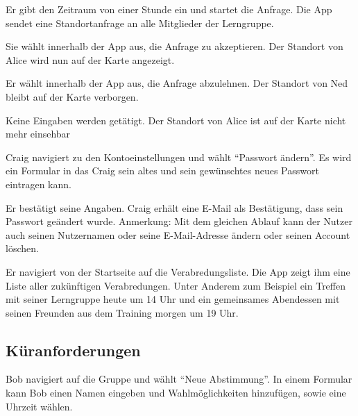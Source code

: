 \documentclass[parskip=full,11pt]{scrartcl}
\begin{document}
{Er gibt den Zeitraum von einer Stunde ein und startet die Anfrage.}
{Die App sendet eine Standortanfrage an alle Mitglieder der Lerngruppe.}

{Sie wählt innerhalb der App aus, die Anfrage zu akzeptieren.}
{Der Standort von Alice wird nun auf der Karte angezeigt.}

{Er wählt innerhalb der App aus, die Anfrage abzulehnen.}
{Der Standort von Ned bleibt auf der Karte verborgen.}

{Keine Eingaben werden getätigt.}
{Der Standort von Alice ist auf der Karte nicht mehr einsehbar}


{Craig navigiert zu den Kontoeinstellungen und wählt \enquote{Passwort ändern}.}
{Es wird ein Formular in das Craig sein altes und sein gewünschtes neues Passwort eintragen kann.}

{Er bestätigt seine Angaben.}
{Craig erhält eine E-Mail als Bestätigung, dass sein Passwort geändert wurde.}
Anmerkung: Mit dem gleichen Ablauf kann der Nutzer auch seinen Nutzernamen oder seine
E-Mail-Adresse ändern oder seinen Account löschen.



{Er navigiert von der Startseite auf die Verabredungsliste.}
{Die App zeigt ihm eine Liste aller zukünftigen Verabredungen.
Unter Anderem zum Beispiel ein Treffen mit seiner Lerngruppe heute um 14 Uhr
und ein gemeinsames Abendessen mit seinen Freunden aus dem Training morgen um 19 Uhr.}


\subsection{Küranforderungen}
{Bob navigiert auf die Gruppe und wählt \enquote{Neue Abstimmung}.}
{In einem Formular kann Bob einen Namen eingeben und Wahlmöglichkeiten hinzufügen,
	sowie eine Uhrzeit wählen.}
\end{document}
